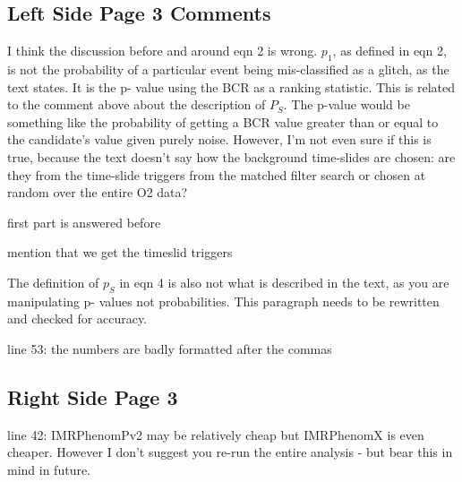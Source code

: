 \documentclass[11pt,leqno]{article}
\begin{document}
\subsection*{Left Side Page 3 Comments} 
\begin{tcolorbox}[left = 1em, top = 1ex, bottom = 1ex, colupper=black, colback=black!10, adjusted title =  Comment 1]
    \setlength\parindent{2em}
	\noindent
	\ttfamily
    I think the discussion before and around eqn 2 is wrong. $p_1$, as defined in eqn 2, is not the probability of a particular event being mis-classified as a glitch, as the text states. It is the p- value using the BCR as a ranking statistic. This is related to the comment above about the description of $P_S$. The p-value would be something like the probability of getting a BCR value greater than or equal to the candidate's value given purely noise. However, I'm not even sure if this is true, because the text doesn't say how the background time-slides are chosen: are they from the time-slide triggers from the matched filter search or chosen at random over the entire O2 data?
\end{tcolorbox}

first part is answered before

mention that we get the timeslid triggers



\begin{tcolorbox}[left = 1em, top = 1ex, bottom = 1ex, colupper=black, colback=black!10, adjusted title =  Comment 2]
    \setlength\parindent{2em}
	\noindent
	\ttfamily
    The definition of $p_S$ in eqn 4 is also not what is described in the text, as you are manipulating p- values not probabilities. This paragraph needs to be rewritten and checked for accuracy.
\end{tcolorbox}


\begin{tcolorbox}[left = 1em, top = 1ex, bottom = 1ex, colupper=black, colback=black!10, adjusted title =  Comment 3]
    \setlength\parindent{2em}
	\noindent
	\ttfamily
    line 53: the numbers are badly formatted after the commas
\end{tcolorbox}


\subsection*{Right Side Page 3} 
\begin{tcolorbox}[left = 1em, top = 1ex, bottom = 1ex, colupper=black, colback=black!10, adjusted title =  Comment 1]
    \setlength\parindent{2em}
	\noindent
	\ttfamily
    line 42: IMRPhenomPv2 may be relatively cheap but IMRPhenomX is even cheaper. However I don't suggest you re-run the entire analysis - but bear this in mind in future.
\end{tcolorbox}
\end{document}
